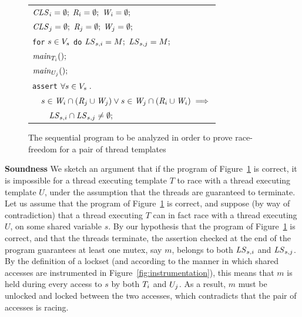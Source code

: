 \begin{figure}
\footnotesize
\begin{tabular}{l}
$\mathit{CLS}_{i} = \emptyset;$ $\mathit{R}_{i} = \emptyset;$ $\mathit{W}_{i} = \emptyset;$ \\
$\mathit{CLS}_{j} = \emptyset;$ $\mathit{R}_{j} = \emptyset;$ $\mathit{W}_{j} = \emptyset;$ \\
\texttt{for} $s \in V_s$ \texttt{do} $\mathit{LS}_{s,i} = M;$ $\mathit{LS}_{s,j} = M;$ \medskip
\\

$\mathit{main}_{T_{i}}();$ \\
$\mathit{main}_{U_{j}}();$ \medskip\\

\texttt{assert} $\forall s \in V_s \; .$ \\

$\quad s \in \mathit{W}_{i} \cap (\mathit{R}_{j} \cup \mathit{W}_{j}) \vee s \in \mathit{W}_{j} \cap (\mathit{R}_{i} \cup \mathit{W}_{i}) \implies$ \\

$\quad\quad \mathit{LS}_{s,i} \cap \mathit{LS}_{s,j} \neq \emptyset;$ \\

\end{tabular}
\caption{The sequential program to be analyzed in order to prove race-freedom for a pair of thread templates}
\label{fig:sequentialization}
\end{figure}

\noindent\textbf{Soundness }
%
We sketch an argument that if the program of Figure~\ref{fig:sequentialization} is correct, it is impossible for a thread executing template $T$ to race with a thread executing template $U$, under the assumption that the threads are guaranteed to terminate. Let us assume that the program of Figure~\ref{fig:sequentialization} is correct, and suppose (by way of contradiction) that a thread executing $T$ can in fact race with a thread executing $U$, on some shared variable $s$.  By our hypothesis that the program of Figure~\ref{fig:sequentialization} is correct, and that the threads terminate, the assertion checked at the end of the program guarantees at least one mutex, say $m$, belongs to both $\mathit{LS}_{s,i}$ and $\mathit{LS}_{s,j}$.  By the definition of a lockset (and according to the manner in which shared accesses are instrumented in Figure~\ref{fig:instrumentation}), this means that $m$ is held during every access to $s$ by both $T_{i}$ and $U_{j}$. As a result, $m$ must be unlocked and locked between the two accesses, which contradicts that the pair of accesses is racing.

